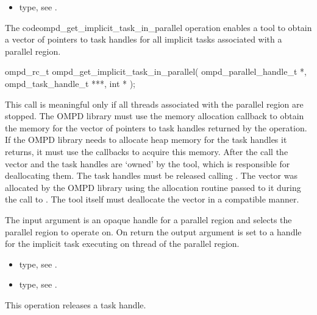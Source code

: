 \crossreferences
\begin{itemize}
	\item {} type, see .
\end{itemize}

\label{ompd:ompd_get_implicit_task_in_parallel}
\summary
The  code{ompd\_get\_implicit\_task\_in\_parallel}  operation enables a tool to obtain a 
vector of pointers to task handles for all implicit tasks associated with a parallel region.

\format

\cspecificstart
\begin{ompSyntax}
ompd_rc_t ompd_get_implicit_task_in_parallel(
  ompd_parallel_handle_t *,
  ompd_task_handle_t ***,
  int *
);
\end{ompSyntax}
\cspecificend


\descr
This call is meaningful only if all threads associated with the parallel region are stopped.
The OMPD library must use the memory allocation callback to obtain the memory for the vector of 
pointers to task handles returned by the operation. If the OMPD library needs to allocate 
heap memory for the task handles it returns, it must use the callbacks to acquire this memory.
After the call the vector and the task handles are `owned' by the tool, which is responsible for 
deallocating them. The task handles must be released calling .
The vector was allocated by the OMPD library using the
allocation routine passed to it during the call to .
The tool itself must deallocate the vector in a compatible manner.

\argdesc
The input argument  is an opaque handle for a parallel region and selects the parallel region to operate on.
On return the output argument  is set to a handle for the implicit task
executing on  thread of the parallel region.

\crossreferences
\begin{itemize}
	\item {} type, see .
	\item {} type, see .
\end{itemize}

\label{ompd:ompd_release_task_handle}
\summary
This operation releases a task handle.

